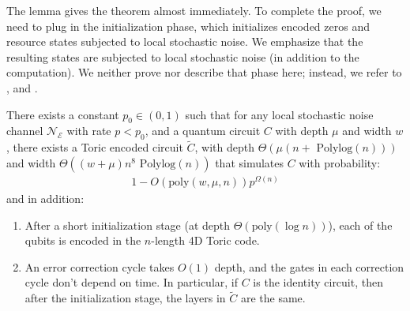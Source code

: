 The lemma gives the theorem almost immediately. To complete the proof, we need to plug in the initialization phase, which initializes encoded zeros and resource states subjected to local stochastic noise. We emphasize that the resulting states are subjected to local stochastic noise (in addition to the computation). We neither prove nor describe that phase here; instead, we refer to \cite{grospellier:tel-03364419, gottesman2014faulttolerant, Fawzi_2018}, and \cite{nguyen2025quantumfaulttoleranceconstantspace}.
  \begin{theorem}
    \label{theorem:main}
    There exists a constant $p_{0} \in (0,1)$ such that for any local stochastic noise channel $\mathcal{N}_{\mathcal{E}}$ with rate $p < p_{0}$, and a quantum circuit $C$ with depth $\mu$ and width $w$, there exists a Toric encoded circuit $\tilde{C}$, with depth $\Theta(\mu (n + \text{ Polylog}(n)) )$ and width $\Theta((w + \mu) n^{8} \text{ Polylog}(n) )$  that simulates $C$ with probability: 
\begin{equation*}
  \begin{split}
    1 -   O \left( \text{poly}(w,\mu,n) \right)  p^{\Omega(n)} 
  \end{split}
\end{equation*}
and in addition: 
\begin{enumerate}
  \item After a short initialization stage (at depth $\Theta( \text{poly}(\log n))$), each of the qubits is encoded in the $n$-length 4D Toric code.
  \item An error correction cycle takes $O(1)$ depth, and the gates in each correction cycle don't depend on time. In particular, if $C$ is the identity circuit, then after the initialization stage, the layers in $\tilde{C}$ are the same.
\end{enumerate}
  \end{theorem} 





